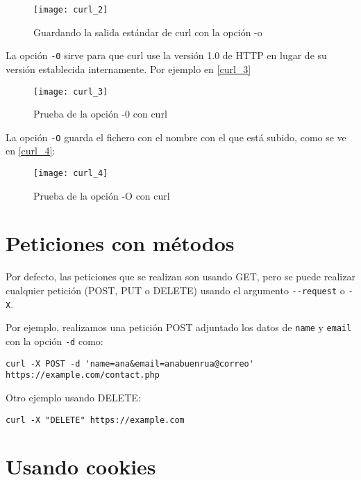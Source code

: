 \begin{figure}[h!]
\begin{center}
\caption{Guardando la salida estándar de curl con la opción -o }
\label{curl_2}
\texttt{[image: curl\_2]}
\end{center}
\end{figure}

La opción \verb|-0| sirve para que curl use la versión 1.0 de HTTP en lugar de su versión establecida internamente. Por ejemplo en \eqref{curl_3}

\begin{figure}[h!]
\begin{center}
\caption{Prueba de la opción -0 con curl }
\label{curl_3}
\texttt{[image: curl\_3]}
\end{center}
\end{figure}

La opción \verb|-O| guarda el fichero con el nombre con el que está subido, como se ve en \eqref{curl_4}:

\begin{figure}[h!]
\begin{center}
\caption{Prueba de la opción -O con curl}
\label{curl_4}
\texttt{[image: curl\_4]}
\end{center}
\end{figure}

\section{Peticiones con métodos}

Por defecto, las peticiones que se realizan son usando GET, pero se puede realizar cualquier petición (POST, PUT o DELETE) usando el argumento \verb|--request| o \verb|-X|.

Por ejemplo, realizamos una petición POST adjuntado los datos de \verb|name| y \verb|email| con la opción \verb|-d| como:
\begin{verbatim}
curl -X POST -d 'name=ana&email=anabuenrua@correo' https://example.com/contact.php
\end{verbatim}

Otro ejemplo usando DELETE:
\begin{verbatim}
curl -X "DELETE" https://example.com
\end{verbatim}

\section{Usando cookies}

